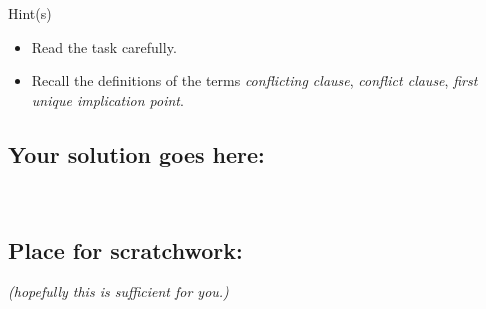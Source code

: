 \documentclass[a4paper,11pt,fleqn]{article}
\begin{document}
\begin{mybclogo}{Hint(s)}
\begin{itemize}
\item Read the task carefully.
\item Recall the definitions of the terms \textit{conflicting clause}, \textit{conflict clause}, \textit{first unique implication point}.
\end{itemize}
\end{mybclogo}

\subsection*{Your solution goes here:}

\clearpage
\newpage
\mbox{~}
\subsection*{Place for scratchwork:} \textit{(hopefully this is sufficient for you.)}
\end{document}
